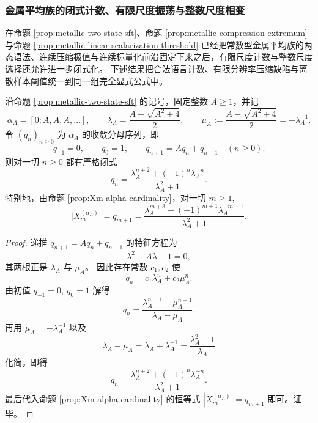 \subsubsection{金属平均族的闭式计数、有限尺度振荡与整数尺度相变}\label{subsubsec:ostrowski-metallic-binet-oscillation-integer-phase-transition}
在命题 \ref{prop:metallic-two-state-sft}、命题 \ref{prop:metallic-compression-extremum} 与命题 \ref{prop:metallic-linear-scalarization-threshold} 已经把常数型金属平均族的两态语法、连续压缩极值与连续标量化前沿固定下来之后，有限尺度计数与整数尺度选择还允许进一步闭式化。
下述结果把合法语言计数、有限分辨率压缩缺陷与离散样本阈值统一到同一组完全显式公式中。

\begin{theorem}\label{thm:metallic-binet-closed-form}
沿命题 \ref{prop:metallic-two-state-sft} 的记号，固定整数 \(A\ge 1\)，并记
\[
\alpha_A=[0;A,A,A,\dots],
\qquad
\lambda_A=\frac{A+\sqrt{A^2+4}}{2},
\qquad
\mu_A:=\frac{A-\sqrt{A^2+4}}{2}=-\lambda_A^{-1}.
\]
令 \((q_n)_{n\ge 0}\) 为 \(\alpha_A\) 的收敛分母序列，即
\[
q_{-1}=0,\qquad q_0=1,\qquad q_{n+1}=Aq_n+q_{n-1}\quad(n\ge 0).
\]
则对一切 \(n\ge 0\) 都有严格闭式
\[
q_n=
\frac{\lambda_A^{n+2}+(-1)^n\lambda_A^{-n}}{\lambda_A^2+1}.
\]
特别地，由命题 \ref{prop:Xm-alpha-cardinality}，对一切 \(m\ge 1\),
\[
\bigl|X_m^{(\alpha_A)}\bigr|
=q_{m+1}
=
\frac{\lambda_A^{m+3}+(-1)^{m+1}\lambda_A^{-m-1}}{\lambda_A^2+1}.
\]
\end{theorem}
\begin{proof}
递推 \(q_{n+1}=Aq_n+q_{n-1}\) 的特征方程为
\[
\lambda^2-A\lambda-1=0,
\]
其两根正是 \(\lambda_A\) 与 \(\mu_A\)。
因此存在常数 \(c_1,c_2\) 使
\[
q_n=c_1\lambda_A^n+c_2\mu_A^n.
\]
由初值 \(q_{-1}=0,\ q_0=1\) 解得
\[
q_n=\frac{\lambda_A^{n+1}-\mu_A^{n+1}}{\lambda_A-\mu_A}.
\]
再用 \(\mu_A=-\lambda_A^{-1}\) 以及
\[
\lambda_A-\mu_A
=
\lambda_A+\lambda_A^{-1}
=
\frac{\lambda_A^2+1}{\lambda_A}
\]
化简，即得
\[
q_n=
\frac{\lambda_A^{n+2}+(-1)^n\lambda_A^{-n}}{\lambda_A^2+1}.
\]
最后代入命题 \ref{prop:Xm-alpha-cardinality} 的恒等式
\(
|X_m^{(\alpha_A)}|=q_{m+1}
\)
即可。证毕。
\end{proof}

